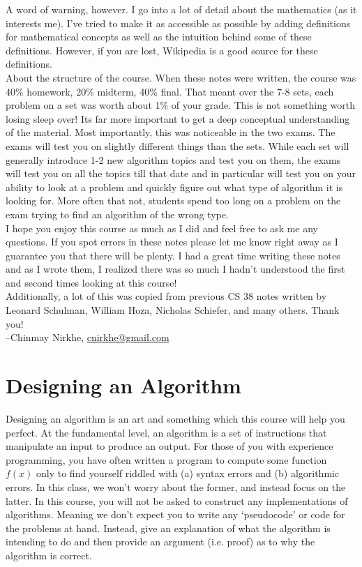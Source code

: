 \documentclass[11pt]{article}
\theoremstyle{plain}
\theoremstyle{definition}
\numberwithin{equation}{section}
\numberwithin{figure}{section}
\begin{document}
\noindent A word of warning, however. I go into a lot of detail about the mathematics (as it interests me). I've tried to make it as accessible as possible by adding definitions for mathematical concepts as well as the intuition behind some of these definitions. However, if you are lost, Wikipedia is a good source for these definitions. \\

\noindent About the structure of the course. When these notes were written, the course was 40\% homework, 20\% midterm, 40\% final. That meant over the 7-8 sets, each problem on a set was worth about 1\% of your grade. This is not something worth losing sleep over! Its far more important to get a deep conceptual understanding of the material. Most importantly, this was noticeable in the two exams. The exams will test you on slightly different things than the sets. While each set will generally introduce 1-2 new algorithm topics and test you on them, the exams will test you on all the topics till that date and in particular will test you on your ability to look at a problem and quickly figure out what type of algorithm it is looking for. More often that not, students spend too long on a problem on the exam trying to find an algorithm of the wrong type. \\

\noindent I hope you enjoy this course as much as I did and feel free to ask me any questions. If you spot errors in these notes please let me know right away as I guarantee you that there will be plenty. I had a great time writing these notes and as I wrote them, I realized there was so much I hadn't understood the first and second times looking at this course! \\

\noindent Additionally, a lot of this was copied from previous CS 38 notes written by Leonard Schulman, William Hoza, Nicholas Schiefer, and many others. Thank you! \\

\noindent --Chinmay Nirkhe, \href{mailto:cnirkhe@gmail.com}{cnirkhe@gmail.com}


\newpage

\section{Designing an Algorithm}

\noindent Designing an algorithm is an art and something which this course will help you perfect. At the fundamental level, an algorithm is a set of instructions that manipulate an input to produce an output. For those of you with experience programming, you have often written a program to compute some function $f(x)$ only to find yourself riddled with (a) syntax errors and (b) algorithmic errors. In this class, we won't worry about the former, and instead focus on the latter. In this course, you will not be asked to construct any implementations of algorithms. Meaning we don't expect you to write any `pseudocode' or code for the problems at hand. Instead, give an explanation of what the algorithm is intending to do and then provide an argument (i.e. proof) as to why the algorithm is correct. \\
\end{document}
